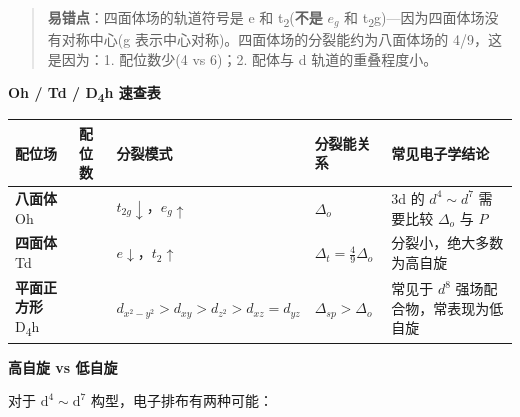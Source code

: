 \documentclass[a4paper,11pt]{ctexart}
\newcounter{none}
\newcommand{\箭}{\ensuremath{\rightarrow}}
\newcommand{\左箭}{\ensuremath{\leftarrow}}
\newcommand{\上箭}{\ensuremath{\uparrow}}
\newcommand{\下箭}{\ensuremath{\downarrow}}
\newcommand{\衡}{\ensuremath{\rightleftharpoons}}
\newcommand{\双箭}{\ensuremath{\leftrightarrow}}
\newcommand{\约等于}{\ensuremath{\approx}}
\newcommand{\小于等于}{\ensuremath{\leq}}
\newcommand{\大于等于}{\ensuremath{\geq}}
\newcommand{\不等于}{\ensuremath{\neq}}
\newcommand{\西格马}{\ensuremath{\sigma}}
\newcommand{\派}{\ensuremath{\pi}}
\begin{document}
\begin{quote}
\textbf{易错点}：四面体场的轨道符号是 e 和 t\textsubscript{2}(\textbf{不是} \(e_g\) 和 t\textsubscript{2}g)---因为四面体场没有对称中心(g 表示中心对称)。四面体场的分裂能约为八面体场的 4/9，这是因为：1. 配位数少(4 vs 6)；2. 配体与 d 轨道的重叠程度小。
\end{quote}

\textbf{Oh / Td / D\textsubscript{4}h 速查表}

{\def\LTcaptype{none} %
\begin{longtable}[]{@{}
  >{\centering\arraybackslash}p{}
  >{\centering\arraybackslash}p{}
  >{\raggedright\arraybackslash}p{}
  >{\centering\arraybackslash}p{}
  >{\raggedright\arraybackslash}p{}@{}}
\toprule\noalign{}
\begin{minipage}[b]{\linewidth}\centering
配位场
\end{minipage} & \begin{minipage}[b]{\linewidth}\centering
配位数
\end{minipage} & \begin{minipage}[b]{\linewidth}\raggedright
分裂模式
\end{minipage} & \begin{minipage}[b]{\linewidth}\centering
分裂能关系
\end{minipage} & \begin{minipage}[b]{\linewidth}\raggedright
常见电子学结论
\end{minipage} \\
\midrule\noalign{}
\endhead
\bottomrule\noalign{}
\endlastfoot
\textbf{八面体} Oh & 6 & \(t_{2g} \downarrow\)，\(e_g \uparrow\) & \(\Delta_o\) & 3d 的 \(d^4 \sim d^7\) 需要比较 \(\Delta_o\) 与 \(P\) \\
\textbf{四面体} Td & 4 & \(e \downarrow\)，\(t_2 \uparrow\) & \(\Delta_t = \frac{4}{9}\Delta_o\) & 分裂小，绝大多数为高自旋 \\
\textbf{平面正方形} D\textsubscript{4}h & 4 & \(d_{x^2-y^2} > d_{xy} > d_{z^2} > d_{xz}=d_{yz}\) & \(\Delta_{sp} > \Delta_o\) & 常见于 \(d^8\) 强场配合物，常表现为低自旋 \\
\end{longtable}
}

\textbf{高自旋 vs 低自旋}

对于 \(\mathrm{d^4 \sim d^7}\) 构型，电子排布有两种可能：
\end{document}
